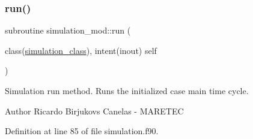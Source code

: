 \subsubsection{\texorpdfstring{run()}{run()}}
{\footnotesize\ttfamily subroutine simulation\+\_\+mod\+::run (\begin{DoxyParamCaption}\item[{class(\mbox{\hyperlink{structsimulation__mod_1_1simulation__class}{simulation\+\_\+class}}), intent(inout)}]{self }\end{DoxyParamCaption})\hspace{0.3cm}{\ttfamily [private]}}



Simulation run method. Runs the initialized case main time cycle. 

\begin{DoxyAuthor}{Author}
Ricardo Birjukovs Canelas -\/ M\+A\+R\+E\+T\+EC 
\end{DoxyAuthor}


Definition at line 85 of file simulation.\+f90.


